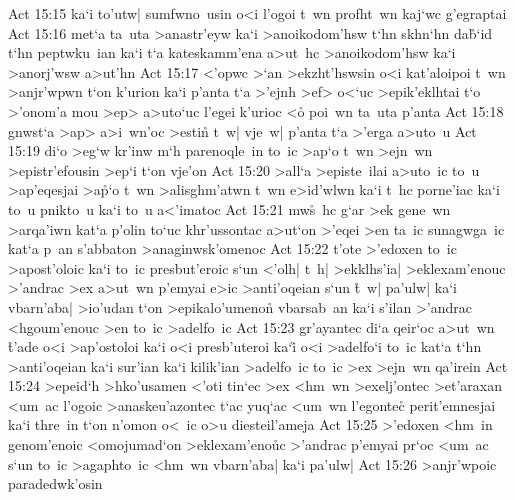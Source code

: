 \vs Act 15:15
ka`i
to'utw|
sumfwno~usin
o<i
l'ogoi
t~wn
profht~wn
kaj`wc
g'egraptai\bibvsend
\vs Act 15:16
met`a
ta~uta
>anastr'eyw
ka`i
>anoikodom'hsw
t`hn
skhn`hn
da\r{b}`id
t`hn
peptwku~ian
ka`i
t`a
kateskamm'ena
a>ut~hc
>anoikodom'hsw
ka`i
>anorj'wsw
a>ut'hn\bibvsend
\vs Act 15:17
<'opwc
>`an
>ekzht'hswsin
o<i
kat'aloipoi
t~wn
>anjr'wpwn
t`on
k'urion
ka`i
p'anta
t`a
>'ejnh
>ef>
o<`uc
>epik'eklhtai
t`o
>'onom'a
mou
>ep>
a>uto`uc
l'egei
k'urioc
<o\r{}
poi~wn
ta~uta
p'anta\bibvsend
\vs Act 15:18
gnwst`a
>ap>
a>i~wn'oc
>estin\r{}
t~w|
vje~w|
p'anta
t`a
>'erga
a>uto~u\bibvsend
\vs Act 15:19
di`o
>eg`w
kr'inw
m`h
parenoqle~in
to~ic
>ap`o
t~wn
>ejn~wn
>epistr'efousin
>ep`i
t`on
vje'on\bibvsend
\vs Act 15:20
>all`a
>episte~ilai
a>uto~ic
to~u
>ap'eqesjai
>a\r{p}`o
t~wn
>alisghm'atwn
t~wn
e>id'wlwn
ka`i
t~hc
porne'iac
ka`i
to~u
pnikto~u
ka`i
to~u
a<'imatoc\bibvsend
\vs Act 15:21
mw\r{s}~hc
g`ar
>ek
gene~wn
>arqa'iwn
kat`a
p'olin
to`uc
khr'ussontac
a>ut`on
>'eqei
>en
ta~ic
sunagwga~ic
kat`a
p~an
s'abbaton
>anaginwsk'omenoc\bibvsend
\vs Act 15:22
t'ote
>'edoxen
to~ic
>apost'oloic
ka`i
to~ic
presbut'eroic
s`un
<'olh|
t~h|
>ekklhs'ia|
>eklexam'enouc
>'andrac
>ex
a>ut~wn
p'emyai
e>ic
>anti'oqeian
s`un
\r{t}~w|
pa'ulw|
ka`i
vbarn'aba|
>io'udan
t`on
>epikalo'umenon\r{}
vbarsab~an
ka`i
s'ilan
>'andrac
<hgoum'enouc
>en
to~ic
>adelfo~ic\bibvsend
\vs Act 15:23
gr'ayantec
di`a
qeir`oc
a>ut~wn
\r{t}'ade
o<i
>ap'ostoloi
ka`i
o<i
presb'uteroi
ka`i\r{}
o<i
>adelfo`i
to~ic
kat`a
t`hn
>anti'oqeian
ka`i
sur'ian
ka`i
kilik'ian
>adelfo~ic
to~ic
>ex
>ejn~wn
qa'irein\bibvsend
\vs Act 15:24
>epeid`h
>hko'usamen
<'oti
tin`ec
>ex
<hm~wn
>exelj'ontec
>et'araxan
<um~ac
l'ogoic
>anaskeu'azontec
t`ac
yuq`ac
<um~wn
l'egontec\r{}
perit'emnesjai
ka`i
thre~in
t`on
n'omon
o<~ic
o>u
diesteil'ameja\bibvsend
\vs Act 15:25
>'edoxen
<hm~in
genom'enoic
<omojumad`on
>eklexam'eno\r{u}c
>'andrac
p'emyai
pr`oc
<um~ac
s`un
to~ic
>agaphto~ic
<hm~wn
vbarn'aba|
ka`i
pa'ulw|\bibvsend
\vs Act 15:26
>anjr'wpoic
paradedwk'osin
